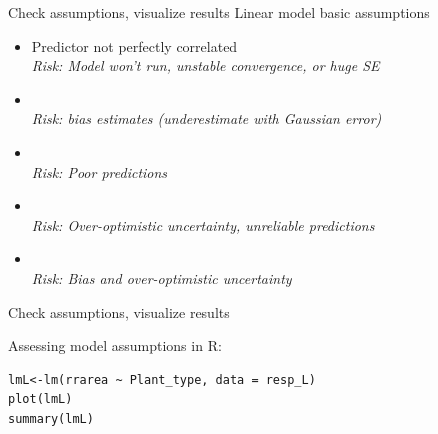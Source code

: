 \documentclass{beamer}
\makeatletter
\newenvironment{kframe}{%
 \def\at@end@of@kframe{}%
 \ifinner\ifhmode%
  \def\at@end@of@kframe{\end{minipage}}%
  \begin{minipage}{\columnwidth}%
 \fi\fi%
 \def\FrameCommand##1{\hskip\@totalleftmargin \hskip-\fboxsep
 \colorbox{shadecolor}{##1}\hskip-\fboxsep
     \hskip-\linewidth \hskip-\@totalleftmargin \hskip\columnwidth}%
 \MakeFramed {\advance\hsize-\width
   \@totalleftmargin\z@ \linewidth\hsize
   \@setminipage}}%
 {\par\unskip\endMakeFramed%
 \at@end@of@kframe}
\newenvironment{knitrout}{}{} %
\makeatother
\begin{document}
\begin{frame}{Check assumptions, visualize results}
\pause 
Linear model basic assumptions
 \begin{block}{}
     \begin{itemize}[<+->]
       \item Predictor not perfectly correlated \\ \textit{Risk: Model won't run, unstable convergence, or huge SE}
       \item {\color{red!20!black}{Little error in predictors}}\\ \textit{Risk: bias estimates (underestimate with Gaussian error)}
       \item {\color{red!50!black}{Gaussian error distribution}}\\ \textit{Risk: Poor predictions}
       \item {\color{red!70!black}{Homoscedasticity (constant error variance)}}\\ \textit{Risk: Over-optimistic uncertainty, unreliable predictions}
       \item {\color{red!99!black}{Independence of error}}\\ \textit{Risk: Bias and over-optimistic uncertainty}
     \end{itemize}
 \end{block}
\end{frame}

\begin{frame}[fragile]{Check assumptions, visualize results}

Assessing model assumptions in R:

\begin{knitrout}
\color{fgcolor}\begin{kframe}
\begin{verbatim}
lmL<-lm(rrarea ~ Plant_type, data = resp_L)
plot(lmL)
summary(lmL)
\end{verbatim}
\end{kframe}
\end{knitrout}

\end{frame}
\end{document}
